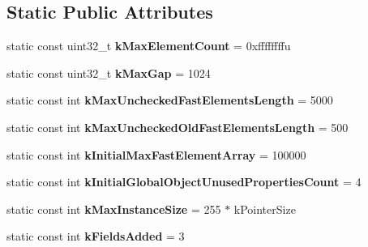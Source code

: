 \subsection*{Static Public Attributes}
\begin{DoxyCompactItemize}
\item 
\hypertarget{classv8_1_1internal_1_1_j_s_object_a94879143e109d2b4105523b69de660a1}{}static const uint32\+\_\+t {\bfseries k\+Max\+Element\+Count} = 0xffffffffu\label{classv8_1_1internal_1_1_j_s_object_a94879143e109d2b4105523b69de660a1}

\item 
\hypertarget{classv8_1_1internal_1_1_j_s_object_a920eb1a5c2f03a3ca10ef3fcc5ac42fe}{}static const uint32\+\_\+t {\bfseries k\+Max\+Gap} = 1024\label{classv8_1_1internal_1_1_j_s_object_a920eb1a5c2f03a3ca10ef3fcc5ac42fe}

\item 
\hypertarget{classv8_1_1internal_1_1_j_s_object_abb22b3e9cd78800bced6ef8dd68447ce}{}static const int {\bfseries k\+Max\+Unchecked\+Fast\+Elements\+Length} = 5000\label{classv8_1_1internal_1_1_j_s_object_abb22b3e9cd78800bced6ef8dd68447ce}

\item 
\hypertarget{classv8_1_1internal_1_1_j_s_object_af317066946eb7d04f0af04c0b1d69d93}{}static const int {\bfseries k\+Max\+Unchecked\+Old\+Fast\+Elements\+Length} = 500\label{classv8_1_1internal_1_1_j_s_object_af317066946eb7d04f0af04c0b1d69d93}

\item 
\hypertarget{classv8_1_1internal_1_1_j_s_object_a6c0f02d2378b33cc825e182e4babccdf}{}static const int {\bfseries k\+Initial\+Max\+Fast\+Element\+Array} = 100000\label{classv8_1_1internal_1_1_j_s_object_a6c0f02d2378b33cc825e182e4babccdf}

\item 
\hypertarget{classv8_1_1internal_1_1_j_s_object_a7f5244c394b225cd572a03cb68ee22c2}{}static const int {\bfseries k\+Initial\+Global\+Object\+Unused\+Properties\+Count} = 4\label{classv8_1_1internal_1_1_j_s_object_a7f5244c394b225cd572a03cb68ee22c2}

\item 
\hypertarget{classv8_1_1internal_1_1_j_s_object_a3d270856f8e8f80f2a80c0c37bda1c23}{}static const int {\bfseries k\+Max\+Instance\+Size} = 255 $\ast$ k\+Pointer\+Size\label{classv8_1_1internal_1_1_j_s_object_a3d270856f8e8f80f2a80c0c37bda1c23}

\item 
\hypertarget{classv8_1_1internal_1_1_j_s_object_a29b37dbc6571c3318647807794a433c8}{}static const int {\bfseries k\+Fields\+Added} = 3\label{classv8_1_1internal_1_1_j_s_object_a29b37dbc6571c3318647807794a433c8}


\end{DoxyCompactItemize}
